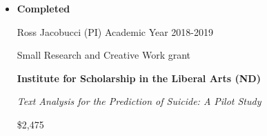\documentclass[letterpaper,10pt]{article}
\begin{document}
\begin{itemize}
\begin{comment}
\begin{center}
	\parbox{6.5in}{{Evan Kleiman (PI)}    \hspace{9.2cm} 6/26/18-12/26/19}
	\parbox{6.5in}{\textbf{Military Suicide Research Consortium Common Data Elements} }
	\parbox{6.5in}{\textit{Enhancing Identification of Suicide Risk among Military Service Members and Veterans: A Machine Learning Approach to Suicidality.}}
	\parbox{6.5in}{\textbf{Role: Consultant}}
\end{center}
	
	\end{comment}
	\item{\textbf{\large{Completed}}}
	
		\begin{center}
		\parbox{6.5in}{{Ross Jacobucci (PI) }   \hspace{9cm} Academic Year 2018-2019}
		\parbox{6.5in}{Small Research and Creative Work grant}
		\parbox{6.5in}{\textbf{Institute for Scholarship in the Liberal Arts (ND)} }
		\parbox{6.5in}{\textit{Text Analysis for the Prediction of Suicide: A Pilot Study}}
		\parbox{6.5in}{\$2,475}
	\end{center}
	
	\begin{comment}
	
	\begin{center}
		\parbox{6.5in}{{T32 AG000037-38  \hspace{1cm} Crimmins (PI)}   \hspace{6.1cm} 01/01/15-07/31/17}
		\parbox{6.5in}{\textbf{Sponsored: Ruth L. Kirschstein National Research Service Award (T32).}}
		\parbox{6.5in}{\textit{Predoctoral trainee on the Multidisciplinary Research Training in Gerontology Grant at USC. }}
		\parbox{6.5in}{Role: Predoctoral Trainee}
	\end{center}
	
		\item{\textbf{\large{Not Funded}}}
		
		\begin{center}
			\parbox{6.5in}{{Ross Jacobucci (PI)} }
			\parbox{6.5in}{\textbf{NIH 1R01MH117597-01} }
			\parbox{6.5in}{\textit{Integrative Data Mining in the Prediction of the Pathway to Suicide.}}
			\parbox{6.5in}{Total Direct: \$540,750}
		\end{center}
\end{comment}	
	
\end{itemize}
\end{document}
